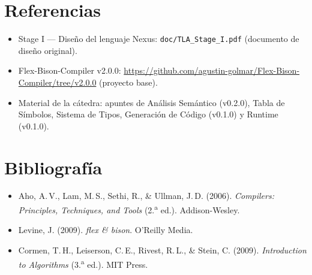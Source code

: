 \documentclass[11pt,a4paper]{article}
\newcommand{\code}[1]{\texttt{#1}}
\begin{document}
\section{Referencias}

\begin{itemize}[noitemsep]
  \item Stage I --- Diseño del lenguaje Nexus: \code{doc/TLA\_Stage\_I.pdf}
        (documento de diseño original).
  \item Flex-Bison-Compiler v2.0.0:
        \url{https://github.com/agustin-golmar/Flex-Bison-Compiler/tree/v2.0.0}
        (proyecto base).
  \item Material de la cátedra: apuntes de Análisis Semántico (v0.2.0), Tabla de
        Símbolos, Sistema de Tipos, Generación de Código (v0.1.0) y Runtime
        (v0.1.0).
\end{itemize}

\section{Bibliografía}

\begin{itemize}[noitemsep]
  \item Aho, A.\,V., Lam, M.\,S., Sethi, R., \& Ullman, J.\,D. (2006).
        \emph{Compilers: Principles, Techniques, and Tools} (2.\textsuperscript{a} ed.).
        Addison-Wesley.
  \item Levine, J. (2009). \emph{flex \& bison}. O'Reilly Media.
  \item Cormen, T.\,H., Leiserson, C.\,E., Rivest, R.\,L., \& Stein, C. (2009).
        \emph{Introduction to Algorithms} (3.\textsuperscript{a} ed.). MIT Press.
\end{itemize}
\end{document}
